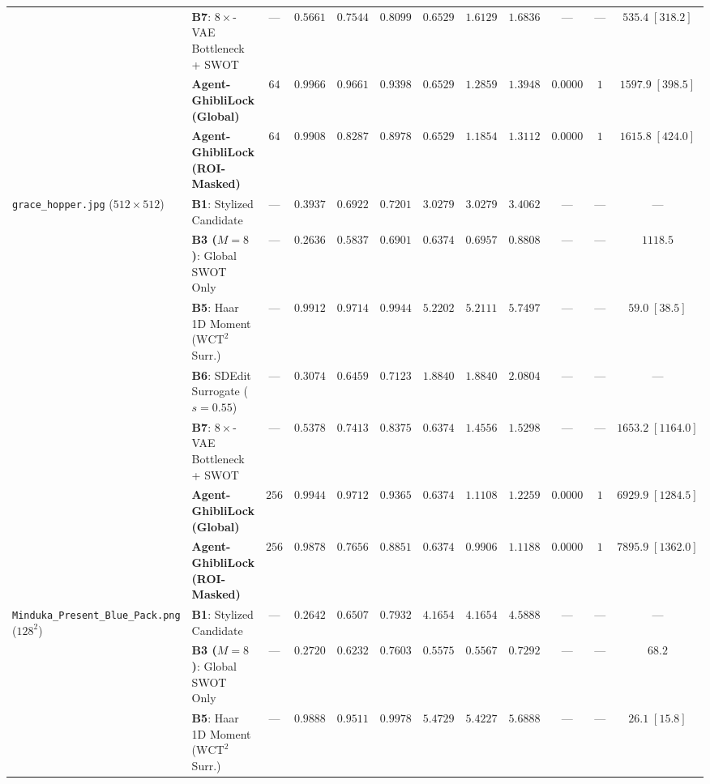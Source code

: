 \documentclass[conference,10pt]{IEEEtran}
\begin{document}
\begin{table}[t!]
{\begin{tabular}{llcccccccccc}
& \textbf{B7}: $8\times$-VAE Bottleneck + SWOT~\cite{zhang2023} & --- & $0.5661$ & $0.7544$ & $0.8099$ & $0.6529$ & $1.6129$ & $1.6836$ & --- & --- & $535.4\;[318.2]$ \\
& \textbf{Agent-GhibliLock (Global)} & $64$ & $\mathbf{0.9966}$ & $\mathbf{0.9661}$ & $0.9398$ & $0.6529$ & $1.2859$ & $1.3948$ & $\mathbf{0.0000}$ & $1$ & $1597.9\;[\mathbf{398.5}]$ \\
& \textbf{Agent-GhibliLock (ROI-Masked)} & $64$ & $0.9908$ & $0.8287$ & $0.8978$ & $0.6529$ & $1.1854$ & $1.3112$ & $\mathbf{0.0000}$ & $1$ & $1615.8\;[\mathbf{424.0}]$ \\
\midrule
\multirow{7}{*}{\texttt{grace\_hopper.jpg} ($512\times 512$)}
& \textbf{B1}: Stylized Candidate & --- & $0.3937$ & $0.6922$ & $0.7201$ & $3.0279$ & $3.0279$ & $3.4062$ & --- & --- & --- \\
& \textbf{B3 ($M=8$)}: Global SWOT Only & --- & $0.2636$ & $0.5837$ & $0.6901$ & $0.6374$ & $\mathbf{0.6957}$ & $\mathbf{0.8808}$ & --- & --- & $1118.5$ \\
& \textbf{B5}: Haar 1D Moment ($\text{WCT}^2$ Surr.)~\cite{yoo2019wct2} & --- & $0.9912$ & $\mathbf{0.9714}$ & $\mathbf{0.9944}$ & $5.2202$ & $5.2111$ & $5.7497$ & --- & --- & $59.0\;[38.5]$ \\
& \textbf{B6}: SDEdit Surrogate ($s=0.55$)~\cite{meng2022sdedit} & --- & $0.3074$ & $0.6459$ & $0.7123$ & $1.8840$ & $1.8840$ & $2.0804$ & --- & --- & --- \\
& \textbf{B7}: $8\times$-VAE Bottleneck + SWOT~\cite{zhang2023} & --- & $0.5378$ & $0.7413$ & $0.8375$ & $0.6374$ & $1.4556$ & $1.5298$ & --- & --- & $1653.2\;[1164.0]$ \\
& \textbf{Agent-GhibliLock (Global)} & $256$ & $\mathbf{0.9944}$ & $0.9712$ & $0.9365$ & $0.6374$ & $1.1108$ & $1.2259$ & $\mathbf{0.0000}$ & $1$ & $6929.9\;[\mathbf{1284.5}]$ \\
& \textbf{Agent-GhibliLock (ROI-Masked)} & $256$ & $0.9878$ & $0.7656$ & $0.8851$ & $0.6374$ & $0.9906$ & $1.1188$ & $\mathbf{0.0000}$ & $1$ & $7895.9\;[\mathbf{1362.0}]$ \\
\midrule
\multirow{7}{*}{\texttt{Minduka\_Present\_Blue\_Pack.png} ($128^2$)}
& \textbf{B1}: Stylized Candidate & --- & $0.2642$ & $0.6507$ & $0.7932$ & $4.1654$ & $4.1654$ & $4.5888$ & --- & --- & --- \\
& \textbf{B3 ($M=8$)}: Global SWOT Only & --- & $0.2720$ & $0.6232$ & $0.7603$ & $0.5575$ & $\mathbf{0.5567}$ & $\mathbf{0.7292}$ & --- & --- & $68.2$ \\
& \textbf{B5}: Haar 1D Moment ($\text{WCT}^2$ Surr.)~\cite{yoo2019wct2} & --- & $0.9888$ & $0.9511$ & $\mathbf{0.9978}$ & $5.4729$ & $5.4227$ & $5.6888$ & --- & --- & $26.1\;[15.8]$ \\

\end{tabular}}
\end{table}
\end{document}
